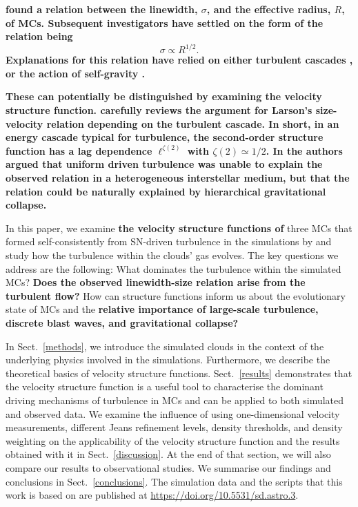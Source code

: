 \textbf{
\citet{Larson1981} found a relation between the linewidth, $\sigma$, and the effective radius, $R$, of MCs.
Subsequent investigators have settled on the form of the relation being \citep{Solomon1987,Falgarone2009,Heyer2009}
}
\begin{equation} \label{eq:larson}
    \sigma \propto R^{1/2}.
\end{equation}
\textbf{Explanations for this relation have relied on either turbulent cascades \citep{Larson1981,Kritsuk2013,Kritsuk2015,Gnedin2015,Padoan2016}, or the action of self-gravity \citep{Elmegreen1993,Vazquez2006,Elmegreen2007,Heyer2009,Ballesteros2011}.
}

\textbf{
These can potentially be distinguished by examining the velocity structure function.
\citet{Kritsuk2013} carefully reviews the argument for Larson's size-velocity relation depending on the turbulent cascade. 
In short, in an energy cascade typical for turbulence, the second-order structure function has a lag dependence $\ell^{\zeta(2)}$ with $\zeta(2) \simeq 1/2$. 
In \citet[hereafter ]{IbanezMejia2016} the authors argued that uniform driven turbulence was unable to explain the observed relation in a heterogeneous interstellar medium, but that the relation could be naturally explained by hierarchical gravitational collapse.
}

In this paper, we examine \textbf{the velocity structure functions of} three MCs that formed self-consistently from SN-driven turbulence in the simulations by \citet[hereafter  and ]{IbanezMejia2016,IbanezMejia2017} and study how the turbulence within the clouds' gas evolves.
The key questions we address are the following:
What dominates the turbulence within the simulated MCs? 
\textbf{Does the observed linewidth-size relation arise from the turbulent flow?}
How can structure functions inform us about the evolutionary state of MCs and the \textbf{relative importance of large-scale turbulence, discrete blast waves, and gravitational collapse?}

In Sect.~\ref{methods}, we introduce the simulated clouds in the context of the underlying physics involved in the simulations.
Furthermore, we describe the theoretical basics of velocity structure functions.
Sect.~\ref{results} demonstrates that the velocity structure function is a useful tool to characterise the dominant driving mechanisms of turbulence in MCs and can be applied to both simulated and observed data. 
We examine the influence of using one-dimensional velocity measurements, different Jeans refinement levels, density thresholds, and density weighting on the applicability of the velocity structure function and the results obtained with it in Sect.~\ref{discussion}.  
At the end of that section, we will also compare our results to observational studies.
We summarise our findings and conclusions in Sect.~\ref{conclusions}.
The simulation data and the scripts that this work is based on are published at {\url{https://doi.org/10.5531/sd.astro.3}}.




\endinput
